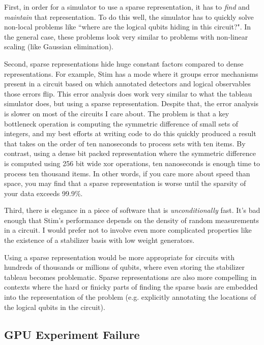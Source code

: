 \documentclass[onecolumn,unpublished]{quantumarticle}
\theoremstyle{definition}
\theoremstyle{definition}
\theoremstyle{definition}
\begin{document}
First, in order for a simulator to use a sparse representation, it has to {\em find} and {\em maintain} that representation.
To do this well, the simulator has to quickly solve non-local problems like ``where are the logical qubits hiding in this circuit?".
In the general case, these problems look very similar to problems with non-linear scaling (like Gaussian elimination).

Second, sparse representations hide huge constant factors compared to dense representations.
For example, Stim has a  mode where it groups error mechanisms present in a circuit based on which annotated detectors and logical observables those errors flip.
This error analysis does work very similar to what the tableau simulator does, but using a sparse representation.
Despite that, the error analysis is slower on most of the circuits I care about.
The problem is that a key bottleneck operation is computing the symmetric difference of small sets of integers, and my best efforts at writing code to do this quickly produced a result that takes on the order of ten nanoseconds to process sets with ten items.
By contrast, using a dense bit packed representation where the symmetric difference is computed using 256 bit wide xor operations, ten nanoseconds is enough time to process ten thousand items.
In other words, if you care more about speed than space, you may find that a sparse representation is worse until the sparsity of your data exceeds 99.9\%.

Third, there is elegance in a piece of software that is {\em unconditionally} fast.
It's bad enough that Stim's performance depends on the density of random measurements in a circuit.
I would prefer not to involve even more complicated properties like the existence of a stabilizer basis with low weight generators.

Using a sparse representation would be more appropriate for circuits with hundreds of thousands or millions of qubits, where even storing the stabilizer tableau becomes problematic.
Sparse representations are also more compelling in contexts where the hard or finicky parts of finding the sparse basis are embedded into the representation of the problem (e.g. explicitly annotating the locations of the logical qubits in the circuit).


\subsection{GPU Experiment Failure}
\end{document}
